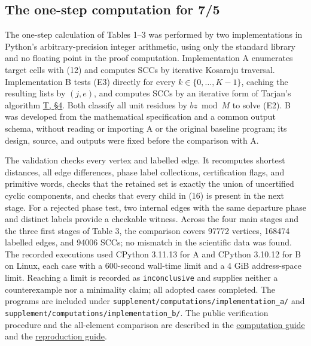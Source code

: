 \documentclass[11pt,reqno]{amsart}
\theoremstyle{definition}
\theoremstyle{remark}
\begin{document}
\subsection{The one-step computation for 7/5}\label{sec:9.2}

The one-step calculation of Tables 1--3 was performed by two
implementations in Python's arbitrary-precision integer arithmetic,
using only the standard library and no floating point in the proof
computation. Implementation A enumerates target cells with (12) and
computes SCCs by iterative Kosaraju traversal. Implementation B tests
(E3) directly for every \(k\in\{0,\ldots,K-1\}\), caching the resulting
lists by \((j,e)\), and computes SCCs by an iterative form of Tarjan's
algorithm \hyperref[ref-t]{T, §4}. Both classify all unit residues by
\(bz\bmod M\) to solve (E2). B was developed from the mathematical
specification and a common output schema, without reading or importing
A or the original baseline program; its design, source, and outputs were
fixed before the comparison with A.

The validation checks every vertex and labelled edge. It recomputes
shortest distances, all edge differences, phase label collections,
certification flags, and primitive words, checks that the retained set is
exactly the union of uncertified cyclic components, and checks that every
child in (16) is present in the next stage. For a rejected phase test,
two internal edges with the same departure phase and distinct labels
provide a checkable witness. Across the four main stages and the three
first stages of Table 3, the comparison covers 97772 vertices, 168474
labelled edges, and 94006 SCCs; no mismatch in the scientific data was
found. The recorded executions used CPython 3.11.13 for A and
CPython 3.10.12 for B on Linux, each case with a 600-second wall-time
limit and a 4 GiB address-space limit. Reaching a limit is recorded as
\texttt{inconclusive} and supplies neither a counterexample nor a minimality
claim; all adopted cases completed. The programs are included under \nolinkurl{supplement/computations/implementation_a/} and \nolinkurl{supplement/computations/implementation_b/}.
The public verification procedure and the all-element comparison are described in the \href{supplement/COMPUTATION.md}{computation guide} and the \href{REPRODUCE.md}{reproduction guide}.

\end{document}
